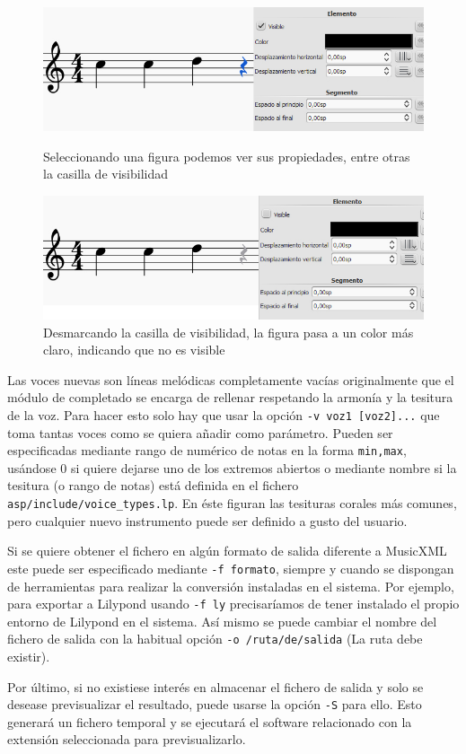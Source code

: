 \begin{figure}[h]
	\centering
	\includegraphics[width=0.8\linewidth]{imagenes/select_silence.jpg}
	\caption{Seleccionando una figura podemos ver sus propiedades, entre otras la casilla de visibilidad}
	\includegraphics[width=0.8\linewidth]{imagenes/invisible_silence.jpg}
	\caption{Desmarcando la casilla de visibilidad, la figura pasa a un color más claro, indicando que no es visible}
	\label{fig:invisible_silence}
\end{figure}

Las voces nuevas son líneas melódicas completamente vacías originalmente que el módulo de completado se encarga de rellenar respetando la armonía y la tesitura de la voz. Para hacer esto solo hay que usar la opción \texttt{-v voz1 [voz2]...} que toma tantas voces como se quiera añadir como parámetro. Pueden ser especificadas mediante rango de numérico de notas en la forma \texttt{min,max}, usándose 0 si quiere dejarse uno de los extremos abiertos o mediante nombre si la tesitura (o rango de notas) está definida en el fichero \texttt{asp/include/voice\_types.lp}. En éste figuran las tesituras corales más comunes, pero cualquier nuevo instrumento puede ser definido a gusto del usuario.

Si se quiere obtener el fichero en algún formato de salida diferente a MusicXML este puede ser especificado mediante \texttt{-f formato}, siempre y cuando se dispongan de herramientas para realizar la conversión instaladas en el sistema. Por ejemplo, para exportar a Lilypond usando \texttt{-f ly} precisaríamos de tener instalado el propio entorno de Lilypond en el sistema. Así mismo se puede cambiar el nombre del fichero de salida con la habitual opción \texttt{-o /ruta/de/salida} (La ruta debe existir).

Por último, si no existiese interés en almacenar el fichero de salida y solo se desease previsualizar el resultado, puede usarse la opción \texttt{-S} para ello. Esto generará un fichero temporal y se ejecutará el software relacionado con la extensión seleccionada para previsualizarlo.

\newpage
\thispagestyle{empty}
